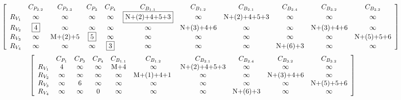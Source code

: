 

\begin{figure*}
  \centering



 \begin{equation*}
\left[ {\begin{array}{*{20}{c}}
&C_{P_{2.2}}&C_{P_{2.3}}&C_{P_3}&C_{P_4}&C_{B_{1.1}}&C_{B_{1.2}}&C_{B_{2.1}}&C_{B_{2.4}}&C_{B_{3.2}}&C_{B_{3.2}}\\
{R_{V_1}}&\infty&\infty&\infty&\infty&\fbox{N+(2)+4+5+3}&\infty&${N+(2)+4+5+3}$&\infty&\infty&\infty\\
R_{V_2}&\fbox{4}&\infty&\infty&\infty&\infty&${N+(3)+4+6}$&\infty&\infty&${N+(3)+4+6}$&\infty\\
R_{V_3}&\infty&${M+(2)+5}$&\fbox{5}&\infty&\infty&\infty&\infty&\infty&\infty&${N+(5)+5+6}$\\
R_{V_4}&\infty&\infty&\infty&\fbox{3}&\infty&\infty&\infty&${N+(6)+3}$&\infty&\infty\\
\end{array}} \right]
\end{equation*}
 \begin{equation*}
\left[ {\begin{array}{*{20}{c}}
&C_{P_{1}}&C_{P_3}&C_{P_4}&C_{B_{1.1}}&C_{B_{1.2}}&C_{B_{2.1}}&C_{B_{2.4}}&C_{B_{3.2}}&C_{B_{3.2}}\\
{R_{V_1}}&4&\infty&\infty&${M+4}$&\infty&$N+(2)+4+5+3$&\infty&\infty&\infty\\
R_{V_2}&\infty&\infty&\infty&\infty&${M+(1)+4+1} $&\infty&\infty&${N+(3)+4+6}$&\infty\\
R_{V_3}&\infty&6&\infty&\infty&\infty&\infty&\infty&\infty&$N+(5)+5+6$\\
R_{V_4}&\infty&\infty&0&\infty&\infty&\infty&$N+(6)+3$&\infty&\infty\\
\end{array}} \right]
\end{equation*}


\end{figure*}
